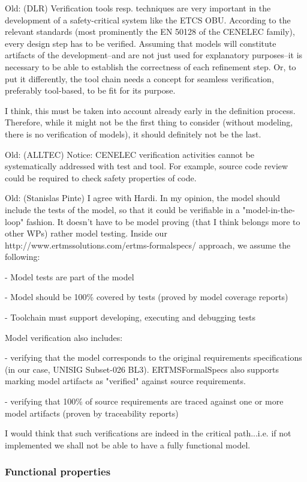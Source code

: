 \documentclass[11pt, a4paper]{article}
\newcommand{\oldtext}[1]{{Old: \scriptsize #1}}
\begin{document}
\oldtext{(DLR)
Verification tools resp. techniques are very important in the development of a safety-critical system like the ETCS OBU. According to the relevant standards (most prominently the EN 50128 of the CENELEC family), every design step has to be verified. Assuming that models will constitute artifacts of the development--and are not just used for explanatory purposes--it is necessary to be able to establish the correctness of each refinement step. Or, to put it differently, the tool chain needs a concept for seamless verification, preferably tool-based, to be fit for its purpose.

I think, this must be taken into account already early in the
definition process. Therefore, while it might not be the first thing
to consider (without modeling, there is no verification of models), it
should definitely not be the last.}


\oldtext{(ALLTEC) Notice: CENELEC verification activities cannot be systematically addressed with test and tool. For example, source code review could be required to check safety properties of code.}
\oldtext{(Stanislas Pinte)
I agree with Hardi.
In my opinion, the model should include the tests of the model, so that it could be verifiable in a "model-in-the-loop" fashion.
It doesn't have to be model proving (that I think belongs more to other WPs) rather model testing.
Inside our http://www.ertmssolutions.com/ertms-formalspecs/ approach, we assume the following:

- Model tests are part of the model

- Model should be 100\% covered by tests (proved by model coverage reports)

- Toolchain must support developing, executing and debugging tests

Model verification also includes:

- verifying that the model corresponds to the original requirements specifications (in our case, UNISIG Subset-026 BL3). ERTMSFormalSpecs also supports marking model artifacts as "verified" against source requirements.

- verifying that 100\% of source requirements are traced against one or more model artifacts (proven by traceability reports)

I would think that such verifications are indeed in the critical
path...i.e. if not implemented we shall not be able to have a fully
functional model.}



\subsubsection{Functional properties}
\end{document}
